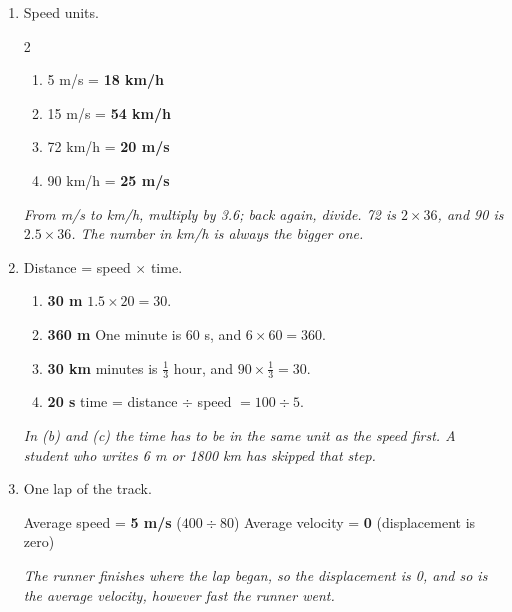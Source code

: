 \documentclass[12pt, twoside]{article}
\begin{document}
\begin{enumerate}[itemsep=0.3cm]
\item Speed units.
  \begin{multicols}{2}
    \begin{enumerate}[itemsep=0.1cm]
      \item 5 m/s = \textbf{18 km/h}
      \item 15 m/s = \textbf{54 km/h}
      \item 72 km/h = \textbf{20 m/s}
      \item 90 km/h = \textbf{25 m/s}
    \end{enumerate}
  \end{multicols}
  \emph{From m/s to km/h, multiply by 3.6; back again, divide. 72 is $2 \times 36$,
  and 90 is $2.5 \times 36$. The number in km/h is always the bigger one.}

\item Distance = speed $\times$ time.
  \begin{enumerate}[itemsep=0.1cm]
    \item \textbf{30 m} \quad $1.5 \times 20 = 30$.
    \item \textbf{360 m} \quad One minute is 60 s, and $6 \times 60 = 360$.
    \item \textbf{30 km}  minutes is $\frac{1}{3}$ hour, and
      $90 \times \frac{1}{3} = 30$.
    \item \textbf{20 s} \quad time = distance $\div$ speed $= 100 \div 5$.
  \end{enumerate}
  \emph{In (b) and (c) the time has to be in the same unit as the speed first. A
  student who writes 6 m or 1800 km has skipped that step.}

\item One lap of the track.

  Average speed = \textbf{5 m/s} \quad ($400 \div 80$) \qquad
  Average velocity = \textbf{0} \quad (displacement is zero)

  \emph{The runner finishes where the lap began, so the displacement is 0, and so is
  the average velocity, however fast the runner went.}

\newpage


\end{enumerate}
\end{document}
